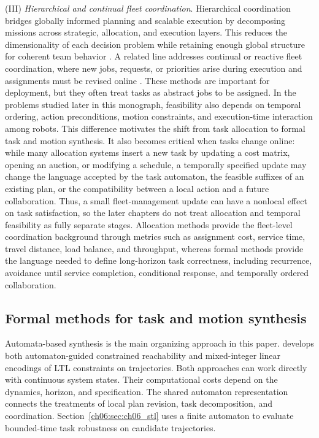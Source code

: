  (III) \emph{Hierarchical and continual fleet coordination}. Hierarchical
coordination bridges globally informed planning and scalable execution by
decomposing missions across strategic, allocation, and execution layers. This
reduces the dimensionality of each decision problem while retaining enough
global structure for coherent team behavior
\citep{leahy2021scalable, leahy2022fast, luo2024decomposition}. A related line
addresses continual or reactive fleet coordination, where new jobs, requests,
or priorities arise during execution and assignments must be revised online
\citep{dai2024dynamic, street2024rightplace, chen2025realtime}. These methods
are important for deployment, but they often treat tasks as abstract jobs to be
assigned. In the problems studied later in this monograph, feasibility also
depends on temporal ordering, action preconditions, motion constraints, and
execution-time interaction among robots. This difference motivates the shift
from task allocation to formal task and motion synthesis. It also becomes
critical when tasks change online: while many allocation systems insert a new
task by updating a cost matrix, opening an auction, or modifying a schedule, a
temporally specified update may change the language accepted by the task
automaton, the feasible suffixes of an existing plan, or the compatibility
between a local action and a future collaboration. Thus, a small
fleet-management update can have a nonlocal effect on task satisfaction, so the
later chapters do not treat allocation and temporal feasibility as fully
separate stages. Allocation methods provide the fleet-level coordination
background through metrics such as assignment cost, service time, travel
distance, load balance, and throughput, whereas formal methods provide the
language needed to define long-horizon task correctness, including recurrence,
avoidance until service completion, conditional response, and temporally ordered
collaboration.


\subsection{Formal methods for task and motion synthesis}
\label{sec:ch01:rw:formal}

\begin{revision}
Automata-based synthesis is the main organizing approach in this paper.
\citet{wolff2014control} develops both automaton-guided constrained
reachability and mixed-integer linear encodings of LTL constraints on
trajectories. Both approaches can work directly with continuous system
states. Their computational costs depend on the dynamics, horizon, and
specification. The shared automaton representation connects the treatments
of local plan revision, task decomposition, and coordination.
Section~\ref{ch06:sec:ch06_stl} uses a finite automaton to evaluate bounded-time
task robustness on candidate trajectories.
\end{revision}


